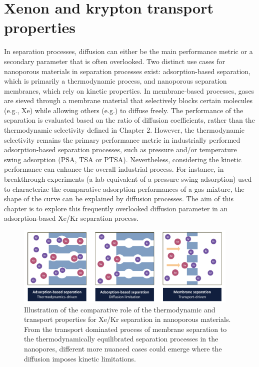 \documentclass[main]{subfiles}
\begin{document}
\chapter{Xenon and krypton transport properties}
\vspace*{-1\baselineskip}


In separation processes, diffusion can either be the main performance metric or a secondary parameter that is often overlooked. Two distinct use cases for nanoporous materials in separation processes exist: adsorption-based separation, which is primarily a thermodynamic process, and nanoporous separation membranes, which rely on kinetic properties. In membrane-based processes, gases are sieved through a membrane material that selectively blocks certain molecules (e.g., Xe) while allowing others (e.g.) to diffuse freely. The performance of the separation is evaluated based on the ratio of diffusion coefficients, rather than the thermodynamic selectivity defined in Chapter 2. However, the thermodynamic selectivity remains the primary performance metric in industrially performed adsorption-based separation processes, such as pressure and/or temperature swing adsorption (PSA, TSA or PTSA). Nevertheless, considering the kinetic performance can enhance the overall industrial process.\autocite{Kumar_1994} For instance, in breakthrough experiments (a lab equivalent of a pressure swing adsorption) used to characterize the comparative adsorption performances of a gas mixture, the shape of the curve can be explained by diffusion processes. The aim of this chapter is to explore this frequently overlooked diffusion parameter in an adsorption-based Xe/Kr separation process.

\begin{figure}[ht]
  \centering
    \includegraphics[width=0.95\textwidth]{figures/5-diffusion/Diffusion.pdf}
    \caption{Illustration of the comparative role of the thermodynamic and transport properties for Xe/Kr separation in nanoporous materials. From the transport dominated process of membrane separation to the thermodynamically equilibrated separation processes in the nanopores, different more nuanced cases could emerge where the diffusion imposes kinetic limitations.}\label{fgr:intro_diffusion}
\end{figure}
\end{document}

